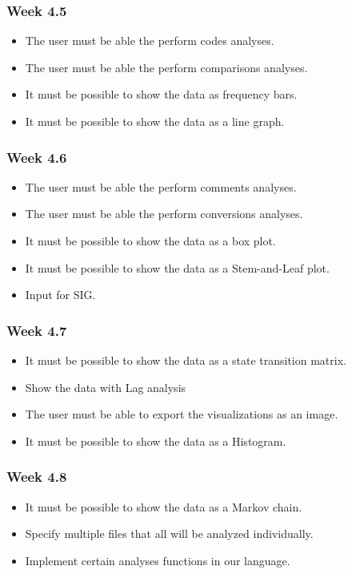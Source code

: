 \subsubsection{Week 4.5}
\begin{itemize}
	\item The user must be able the perform codes analyses.
	\item The user must be able the perform comparisons analyses.
	\item It must be possible to show the data as frequency bars.
	\item It must be possible to show the data as a line graph.
\end{itemize}
\subsubsection{Week 4.6}
\begin{itemize}
	\item The user must be able the perform comments analyses.
	\item The user must be able the perform conversions analyses.
	\item It must be possible to show the data as a box plot.
	\item It must be possible to show the data as a Stem-and-Leaf plot.
	\item Input for SIG.
\end{itemize}
\subsubsection{Week 4.7}
\begin{itemize}
	\item It must be possible to show the data as a state transition matrix.
	\item Show the data with Lag analysis
	\item The user must be able to export the visualizations as an image.
	\item It must be possible to show the data as a Histogram.
\end{itemize}
\subsubsection{Week 4.8}
\begin{itemize}
	\item It must be possible to show the data as a Markov chain.
	\item Specify multiple files that all will be analyzed individually.
	\item Implement certain analyses functions in our language.
\end{itemize}
